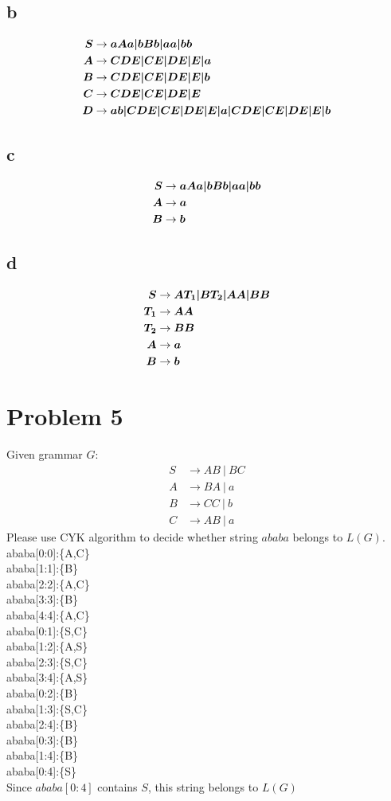 \documentclass[a4paper,UTF8]{ctexart}
\theoremstyle{definition}
\begin{document}
\subsection*{b}

\begin{alignat*}{2}
  \boldsymbol{S} &\rightarrow \boldsymbol{aAa|bBb|aa|bb}\\
  \boldsymbol{A} &\rightarrow \boldsymbol{CDE|CE|DE|E|a}\\
  \boldsymbol{B} &\rightarrow \boldsymbol{CDE|CE|DE|E|b}\\
  \boldsymbol{C} &\rightarrow \boldsymbol{CDE|CE|DE|E}\\
  \boldsymbol{D} &\rightarrow \boldsymbol{ab|CDE|CE|DE|E|a|CDE|CE|DE|E|b}
\end{alignat*}

\subsection*{c}
\begin{alignat*}{2}
  \boldsymbol{S} &\rightarrow \boldsymbol{aAa|bBb|aa|bb}\\
  \boldsymbol{A} &\rightarrow \boldsymbol{a}\\
  \boldsymbol{B} &\rightarrow \boldsymbol{b}\\
\end{alignat*}

\subsection*{d}
\begin{alignat*}{2}
  \boldsymbol{S} &\rightarrow \boldsymbol{AT_1|BT_2|AA|BB}\\
  \boldsymbol{T_1} &\rightarrow \boldsymbol{AA}\\
  \boldsymbol{T_2} &\rightarrow \boldsymbol{BB}\\  
  \boldsymbol{A} &\rightarrow \boldsymbol{a}\\
  \boldsymbol{B} &\rightarrow \boldsymbol{b}\\
\end{alignat*}

\section*{Problem 5}
Given grammar $G$:
\[
	\begin{aligned}
		S & \rightarrow AB\ |\ BC \\
		A & \rightarrow BA\ |\ a  \\
		B & \rightarrow CC\ |\ b  \\
		C & \rightarrow AB\ |\ a
	\end{aligned}
\]
Please use CYK algorithm to decide whether string $ababa$ belongs to $L(G)$.
\newcommand{\cyk}[3]{ababa[#1:#2]:\{#3\}\\}\\
\cyk{0}{0}{A,C}
\cyk{1}{1}{B}
\cyk{2}{2}{A,C}
\cyk{3}{3}{B}
\cyk{4}{4}{A,C}
\cyk{0}{1}{S,C}
\cyk{1}{2}{A,S}
\cyk{2}{3}{S,C}
\cyk{3}{4}{A,S}
\cyk{0}{2}{B}
\cyk{1}{3}{S,C}
\cyk{2}{4}{B}
\cyk{0}{3}{B}
\cyk{1}{4}{B}
\cyk{0}{4}{S}
Since $ababa[0:4]$ contains $S$, this string belongs to $L(G)$
\end{document}
